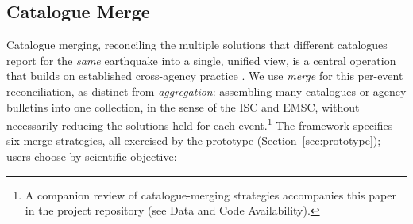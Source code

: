 \documentclass[11pt]{article}
\begin{document}
\subsection{Catalogue Merge}
\label{sec:merge}
Catalogue merging, reconciling the multiple solutions that different catalogues report for the \emph{same} earthquake into a single, unified view, is a central operation that builds on established cross-agency practice \citep{Si2024, NCEDCComCat}. We use \emph{merge} for this per-event reconciliation, as distinct from \emph{aggregation}: assembling many catalogues or agency bulletins into one collection, in the sense of the ISC and EMSC, without necessarily reducing the solutions held for each event.\footnote{A companion review of catalogue-merging strategies accompanies this paper in the project repository (see Data and Code Availability).} The framework specifies six merge strategies, all exercised by the prototype (Section~\ref{sec:prototype}); users choose by scientific objective:
\end{document}
